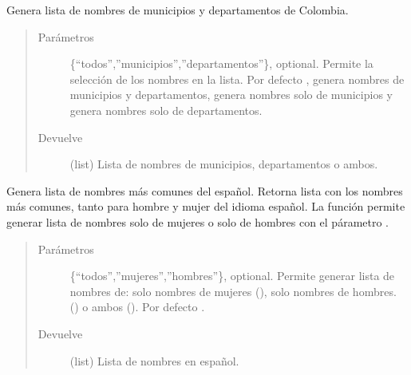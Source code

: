 \documentclass[letterpaper,10pt,openany,spanish]{sphinxmanual}
\begin{document}
\begin{fulllineitems}
\label{\detokenize{funciones/limpieza:limpieza.lista_geo_colombia}}
Genera lista de nombres de municipios y departamentos de Colombia.
\begin{quote}\begin{description}
\item[{Parámetros}] \leavevmode
{} \textendash{} \{“todos”,”municipios”,”departamentos”\}, optional. Permite la selección de los         nombres en la lista. Por defecto , genera nombres de municipios y departamentos,          genera nombres solo de municipios y  genera nombres         solo de departamentos.

\item[{Devuelve}] \leavevmode
(list) Lista de nombres de municipios, departamentos o ambos.

\end{description}\end{quote}

\end{fulllineitems}


\begin{fulllineitems}
\label{\detokenize{funciones/limpieza:limpieza.lista_nombres}}
Genera lista de nombres más comunes del español. Retorna lista con los nombres     más comunes, tanto para hombre y mujer del idioma español. La función permite generar     lista de nombres solo de mujeres o solo de hombres con el párametro .
\begin{quote}\begin{description}
\item[{Parámetros}] \leavevmode
{} \textendash{} \{“todos”,”mujeres”,”hombres”\}, optional. Permite generar lista de nombres         de: solo nombres de mujeres (), solo nombres de hombres.         () o ambos (). Por defecto .

\item[{Devuelve}] \leavevmode
(list) Lista de nombres en español.

\end{description}\end{quote}

\end{fulllineitems}
\end{document}
